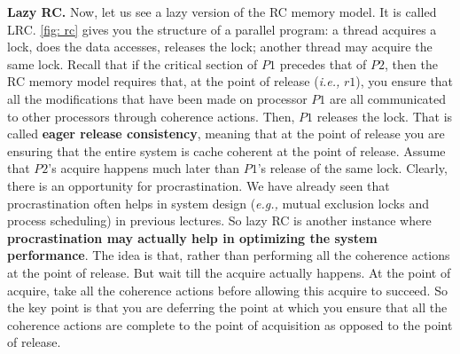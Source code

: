 \documentclass[11pt]{lecture}
\begin{document}
\noindent
{\bf Lazy RC.} Now, let us see a lazy version of the RC memory model. It is called LRC. \autoref{fig: rc} 
gives you the structure of a parallel program: a thread acquires a lock, does the data accesses, releases the 
lock; another thread may acquire the same lock. Recall that if the critical section of $P1$ precedes 
that of $P2$, then the RC memory model requires that, at the point of release ({\it i.e.,} $r1$),  
you ensure that all the modifications that have been made on processor $P1$ are all communicated to 
other processors through coherence actions. Then, $P1$ releases the lock. That is called {\bf 
eager release consistency}, meaning that at the point of release you are ensuring that the 
entire system is cache coherent at the point of release. Assume that $P2$'s acquire happens much 
later than $P1$'s release of the same lock. Clearly, there is an opportunity for 
procrastination. We have already seen that procrastination often helps in system design ({\it e.g.,} 
mutual exclusion locks and process scheduling) in previous lectures. So lazy RC is another instance 
where {\bf procrastination may actually help in optimizing the system performance}. The idea is that, 
rather than performing all the coherence actions at the point of release. But wait till the acquire 
actually happens. At the point of acquire, take all the coherence actions before allowing this acquire to succeed. 
So the key point is that you are deferring the point at which you ensure that all the coherence 
actions are complete to the point of acquisition as opposed to the point of release. 
\end{document}

